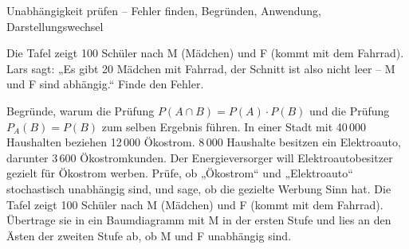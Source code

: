 \begin{aufgabe}{Unabhängigkeit prüfen – Fehler finden, Begründen, Anwendung, Darstellungswechsel}
\begin{teile}
\teil Die Tafel zeigt 100 Schüler nach M (Mädchen) und F (kommt mit dem Fahrrad). Lars sagt: „Es gibt 20 Mädchen mit Fahrrad, der Schnitt ist also nicht leer – M und F sind abhängig.“ Finde den Fehler.

\teil Begründe, warum die Prüfung $P(A \cap B) = P(A) \cdot P(B)$ und die Prüfung $P_A(B) = P(B)$ zum selben Ergebnis führen.
\teil In einer Stadt mit 40\,000 Haushalten beziehen 12\,000 Ökostrom. 8\,000 Haushalte besitzen ein Elektroauto, darunter 3\,600 Ökostromkunden. Der Energieversorger will Elektroautobesitzer gezielt für Ökostrom werben. Prüfe, ob „Ökostrom“ und „Elektroauto“ stochastisch unabhängig sind, und sage, ob die gezielte Werbung Sinn hat.
\teil Die Tafel zeigt 100 Schüler nach M (Mädchen) und F (kommt mit dem Fahrrad). Übertrage sie in ein Baumdiagramm mit M in der ersten Stufe und lies an den Ästen der zweiten Stufe ab, ob M und F unabhängig sind.

\end{teile}
\end{aufgabe}
